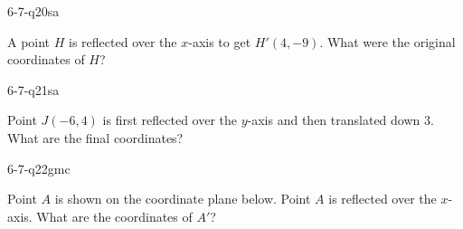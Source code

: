 \begin{practiceQuestion}{6-7-q20}{sa}
\begin{questionText}
A point $H$ is reflected over the $x$-axis to get $H'(4, -9)$. What were the original coordinates of $H$?
\end{questionText}
\end{practiceQuestion}

\begin{practiceQuestion}{6-7-q21}{sa}
\begin{questionText}
Point $J(-6, 4)$ is first reflected over the $y$-axis and then translated down $3$. What are the final coordinates?
\end{questionText}
\end{practiceQuestion}


\begin{practiceQuestion}{6-7-q22}{gmc}
\begin{questionText}
Point $A$ is shown on the coordinate plane below. Point $A$ is reflected over the $x$-axis. What are the coordinates of $A'$?

\begin{center}
\end{center}
\end{questionText}
\end{practiceQuestion}

